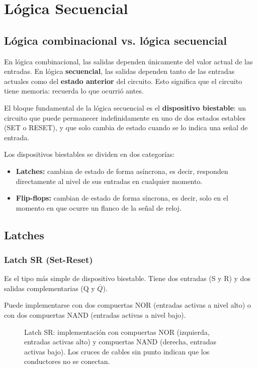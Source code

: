 \chapter{Lógica Secuencial}

\section{Lógica combinacional vs. lógica secuencial}

En lógica combinacional, las salidas dependen únicamente del valor actual de las entradas. En lógica \textbf{secuencial}, las salidas dependen tanto de las entradas actuales como del \textbf{estado anterior} del circuito. Esto significa que el circuito tiene memoria: recuerda lo que ocurrió antes.

El bloque fundamental de la lógica secuencial es el \textbf{dispositivo biestable}: un circuito que puede permanecer indefinidamente en uno de dos estados estables (SET o RESET), y que solo cambia de estado cuando se lo indica una señal de entrada.

Los dispositivos biestables se dividen en dos categorías:

\begin{itemize}
    \item \textbf{Latches:} cambian de estado de forma asíncrona, es decir, responden directamente al nivel de sus entradas en cualquier momento.
    \item \textbf{Flip-flops:} cambian de estado de forma síncrona, es decir, solo en el momento en que ocurre un flanco de la señal de reloj.
\end{itemize}

\section{Latches}

\subsection{Latch SR (Set-Reset)}

Es el tipo más simple de dispositivo biestable. Tiene dos entradas (S y R) y dos salidas complementarias (Q y $\overline{Q}$).

Puede implementarse con dos compuertas NOR (entradas activas a nivel alto) o con dos compuertas NAND (entradas activas a nivel bajo).

\begin{figure}[H]
\centering

\caption{Latch SR: implementación con compuertas NOR (izquierda, entradas activas alto)
  y compuertas NAND (derecha, entradas activas bajo).
  Los cruces de cables sin punto indican que los conductores no se conectan.}
\end{figure}

